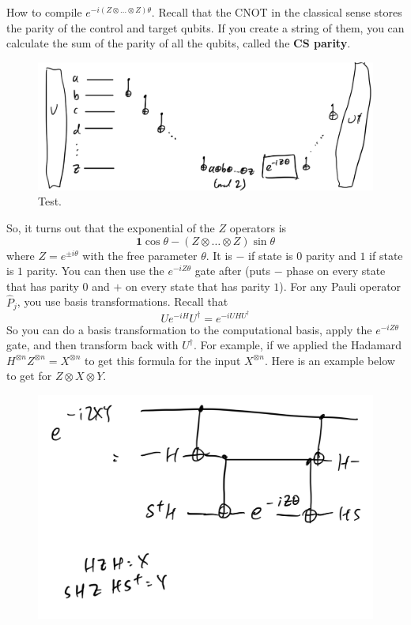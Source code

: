 \documentclass{article}
\begin{document}
  \begin{example}[Exercise 2: I.D.4]
    How to compile $e^{-i (Z \otimes \ldots \otimes Z )\theta}$. Recall that the CNOT in the classical sense stores the parity of the control and target qubits. If you create a string of them, you can calculate the sum of the parity of all the qubits, called the \textbf{CS parity}. 
    \begin{figure}[H]
      \centering 
      \includegraphics[scale=0.4]{img/one.png}
      \caption{Test. } 
      \label{fig:one}
    \end{figure}
    So, it turns out that the exponential of the $Z$ operators is 
    \begin{equation}
      \mathbf{1} \cos{\theta} - (Z \otimes \ldots \otimes Z )\sin{\theta}
    \end{equation}
    where $Z = e^{\pm i \theta}$ with the free parameter $\theta$. It is $-$ if state is $0$ parity and $1$ if state is $1$ parity. You can then use the $e^{-i Z \theta}$ gate after (puts $-$ phase on every state that has parity $0$ and $+$ on every state that has parity $1$). For any Pauli operator$\hat{P}_j$, you use basis transformations. Recall that 
    \begin{equation}
      U e^{-i H} U^\dagger = e^{-i U H U^\dagger}
    \end{equation}
    So you can do a basis transformation to the computational basis, apply the $e^{-i Z \theta}$ gate, and then transform back with $U^\dagger$. For example, if we applied the Hadamard $H^{\otimes n} Z^{\otimes n} = X^{\otimes n}$ to get this formula for the input $X^{\otimes n}$. Here is an example below to get for $Z \otimes X \otimes Y$. 
    \begin{figure}[H]
      \centering 
      \includegraphics[scale=0.4]{img/two.png}

\end{figure}
\end{example}
\end{document}
